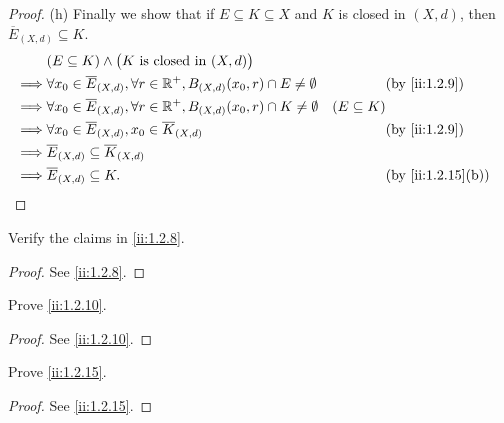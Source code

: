 \begin{proof}{(h)}
  Finally we show that if \(E \subseteq K \subseteq X\) and \(K\) is closed in \((X, d)\), then \(\overline{E}_{(X, d)} \subseteq K\).
  \begin{align*}
             & (E \subseteq K) \land \big(K \text{ is closed in } (X, d)\big)                                                                            \\
    \implies & \forall x_0 \in \overline{E}_{(X, d)}, \forall r \in \R^+, B_{(X, d)}(x_0, r) \cap E \neq \emptyset &                 & \by{ii:1.2.9}     \\
    \implies & \forall x_0 \in \overline{E}_{(X, d)}, \forall r \in \R^+, B_{(X, d)}(x_0, r) \cap K \neq \emptyset & (E \subseteq K)                     \\
    \implies & \forall x_0 \in \overline{E}_{(X, d)}, x_0 \in \overline{K}_{(X, d)}                                &                 & \by{ii:1.2.9}     \\
    \implies & \overline{E}_{(X, d)} \subseteq \overline{K}_{(X, d)}                                                                                     \\
    \implies & \overline{E}_{(X, d)} \subseteq K.                                                                  &                 & \by{ii:1.2.15}[b]
  \end{align*}
\end{proof}

\exercisesection

\begin{ex}\label{ii:ex:1.2.1}
  Verify the claims in \cref{ii:1.2.8}.
\end{ex}

\begin{proof}
  See \cref{ii:1.2.8}.
\end{proof}

\begin{ex}\label{ii:ex:1.2.2}
  Prove \cref{ii:1.2.10}.
\end{ex}

\begin{proof}
  See \cref{ii:1.2.10}.
\end{proof}

\begin{ex}\label{ii:ex:1.2.3}
  Prove \cref{ii:1.2.15}.
\end{ex}

\begin{proof}
  See \cref{ii:1.2.15}.
\end{proof}

